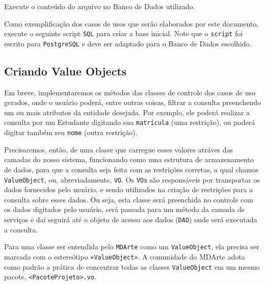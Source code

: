 Execute o conteúdo do arquivo no Banco de Dados utilizado.

Como exemplificação dos casos de usos que serão elaborados por este documento,
execute o seguinte script \texttt{SQL} para criar a base inicial. Note que o
\texttt{script} foi escrito para \texttt{PostgreSQL} e deve ser adaptado para o
Banco de Dados escolhido.

\begin{framed}
	
\end{framed}

\subsection{Criando Value Objects}

Em breve, implementaremos os métodos das classes de controle dos casos de uso
gerados, onde o usuário poderá, entre outras coisas, filtrar a consulta
preenchendo um ou mais atributos da entidade desejada. Por exemplo, ele poderá
realizar a consulta por um Estudante digitando sua \texttt{matrícula} (uma
restrição), ou poderá digitar também seu \texttt{nome} (outra restrição).

Precisaremos, então, de uma classe que carregue esses valores atráves das
camadas do nosso sistema, funcionando como uma estrutura de armazenamento de
dados, para que a consulta seja feita com as restrições corretas, a qual chamos
\texttt{ValueObject}, ou, abreviadamente, \texttt{VO}. Os \texttt{VOs} são
responsáveis por transportar os dados fornecidos pelo usuário, e sendo
utilizados na criação de restrições para a consulta sobre esses dados. Ou seja,
esta classe será preenchida no controle com os dados digitados pelo usuário,
será passada para um método da camada de serviços e daí seguirá até o objeto de
acesso aos dados (\texttt{DAO}) onde será executada a consulta.

Para uma classe ser entendida pelo \texttt{MDArte} como um \texttt{ValueObject},
ela precisa ser marcada com o estereótipo \texttt{«ValueObject»}. A comunidade
do MDArte adota como padrão a prática de concentrar todas as classes
\texttt{ValueObject} em um mesmo pacote, \texttt{<PacoteProjeto>.vo}.

